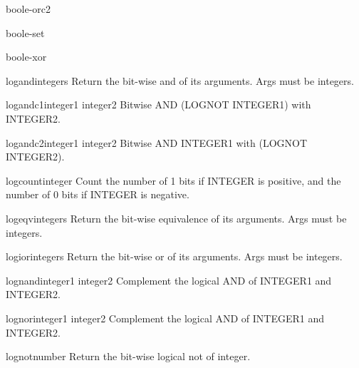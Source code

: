 \documentclass[10pt,english]{book}
\begin{document}
\begin{constant}{boole-orc2}{}
  
\end{constant}

\begin{constant}{boole-set}{}
  
\end{constant}

\begin{constant}{boole-xor}{}
  
\end{constant}

\begin{function}{logand}{\rest integers}
  Return the bit-wise and of its arguments. Args must be integers.
\end{function}

\begin{function}{logandc1}{integer1 integer2}
  Bitwise AND (LOGNOT INTEGER1) with INTEGER2.
\end{function}

\begin{function}{logandc2}{integer1 integer2}
  Bitwise AND INTEGER1 with (LOGNOT INTEGER2).
\end{function}

\begin{function}{logcount}{integer}
  Count the number of 1 bits if INTEGER is positive, and the number of 0 bits
  if INTEGER is negative.
\end{function}

\begin{function}{logeqv}{\rest integers}
  Return the bit-wise equivalence of its arguments. Args must be integers.
\end{function}

\begin{function}{logior}{\rest integers}
  Return the bit-wise or of its arguments. Args must be integers.
\end{function}

\begin{function}{lognand}{integer1 integer2}
  Complement the logical AND of INTEGER1 and INTEGER2.
\end{function}

\begin{function}{lognor}{integer1 integer2}
  Complement the logical AND of INTEGER1 and INTEGER2.
\end{function}

\begin{function}{lognot}{number}
  Return the bit-wise logical not of integer.
\end{function}
\end{document}
